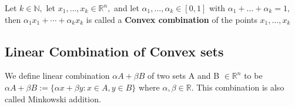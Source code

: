 \documentclass[oneside]{book}
\begin{document}
Let $k \in \mathbb{N},$ let $x_{1}, \ldots, x_{k} \in \mathbb{R}^{n},$ and let $\alpha_{1}, \ldots, \alpha_{k} \in[0,1]$ with $\alpha_{1}+\ldots+\alpha_{k}=1,$ then
$\alpha_{1} x_{1}+\cdots+\alpha_{k} x_{k}$ is called a \textbf{Convex combination} of the points $x_{1}, \ldots, x_{k}$









\subsection{Linear Combination of Convex sets}
\label{ss:5}
We define linear combination $\alpha A+\beta B$ of two sets A and B $\in \mathbb{R}^n$ to be 
$\alpha A+\beta B:=\{\alpha x+\beta y: x \in A, y \in B\}$ where $\alpha,\beta \in \mathbb{R}$.
This combination is also called Minkowski addition.
\end{document}
